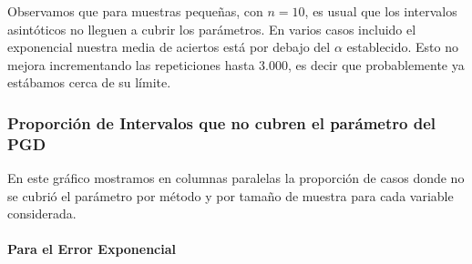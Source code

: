 \documentclass[]{article}
\let\oldparagraph\paragraph
\renewcommand{\paragraph}[1]{\oldparagraph{#1}\mbox{}}
\begin{document}
Observamos que para muestras pequeñas, con \(n=10\), es usual que los
intervalos asintóticos no lleguen a cubrir los parámetros. En varios
casos incluido el exponencial nuestra media de aciertos está por debajo
del \(\alpha\) establecido. Esto no mejora incrementando las
repeticiones hasta 3.000, es decir que probablemente ya estábamos cerca
de su límite.

\hypertarget{proporcion-de-intervalos-que-no-cubren-el-parametro-del-pgd}{%
\subsubsection{Proporción de Intervalos que no cubren el parámetro del
PGD}\label{proporcion-de-intervalos-que-no-cubren-el-parametro-del-pgd}}

En este gráfico mostramos en columnas paralelas la proporción de casos
donde no se cubrió el parámetro por método y por tamaño de muestra para
cada variable considerada.

\hypertarget{para-el-error-exponencial}{%
\paragraph{Para el Error Exponencial}\label{para-el-error-exponencial}}
\end{document}
